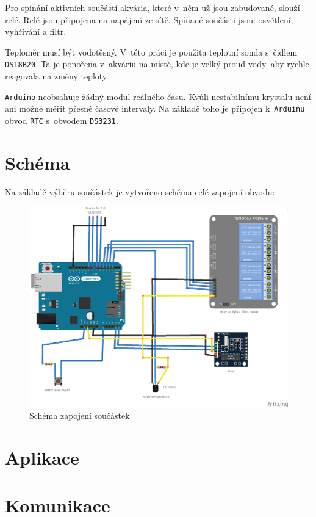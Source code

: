 \documentclass[a4paper,10pt]{article}
\newcommand{\ttt}[1]{\texttt{#1}}
\begin{document}
Pro spínání aktivních součástí akvária, které v~něm už jsou zabudované, slouží relé. Relé jsou připojena na napájení ze sítě. Spínané součásti jsou: osvětlení, vyhřívání a filtr.

Teploměr musí být vodotěsný. V~této práci je použita teplotní sonda s~čidlem \ttt{DS18B20}. Ta je ponořena v~akváriu na místě, kde je velký proud vody, aby rychle reagovala na změny teploty.

\ttt{Arduino} neobsahuje žádný modul reálného času. Kvůli nestabilnímu krystalu není ani možné měřit přesné časové intervaly. Na základě toho je připojen k~\ttt{Arduinu} obvod \ttt{RTC} s~obvodem \ttt{DS3231}.

\section{Schéma}

Na základě výběru součástek je vytvořeno schéma celé zapojení obvodu:

\begin{figure}[H]
  \centering
    \includegraphics[width=1\textwidth]{schema_bb.png}
  \caption{Schéma zapojení součástek}
  \label{char:scbb}
\end{figure}

\section{Aplikace}

\section{Komunikace}
\end{document}
